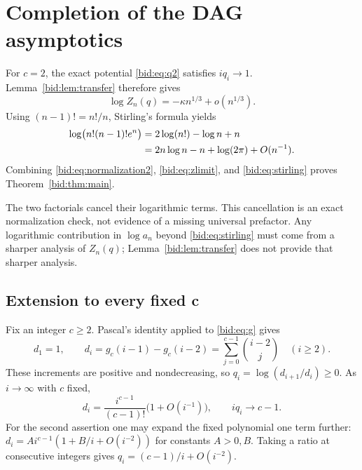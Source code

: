 \documentclass[11pt,letterpaper]{article}
\numberwithin{equation}{section}
\theoremstyle{remark}\newtheorem{remark}[theorem]{Remark}
\begin{document}
\section{Completion of the DAG asymptotics}\label{bid:sec:completion}
For $c=2$, the exact potential \eqref{bid:eq:q2} satisfies
$iq_i\to1$. Lemma~\ref{bid:lem:transfer} therefore gives
\begin{equation}\label{bid:eq:zlimit}
 \log Z_n(q)=-\kappa n^{1/3}+o(n^{1/3}).
\end{equation}
Using $(n-1)!=n!/n$, Stirling's formula yields
\begin{align}
 \log\bigl(n!(n-1)!e^n\bigr)
 &=2\log(n!)-\log n+n\notag\\
 &=2n\log n-n+\log(2\pi)+O(n^{-1}).\label{bid:eq:stirling}
\end{align}
Combining \eqref{bid:eq:normalization2}, \eqref{bid:eq:zlimit}, and
\eqref{bid:eq:stirling} proves Theorem~\ref{bid:thm:main}.

The two factorials cancel their logarithmic terms. This cancellation
is an exact normalization check, not evidence of a missing universal
prefactor. Any logarithmic contribution in $\log a_n$ beyond
\eqref{bid:eq:stirling} must come from a sharper analysis of $Z_n(q)$;
Lemma~\ref{bid:lem:transfer} does not provide that sharper analysis.

\subsection{Extension to every fixed c}
Fix an integer $c\geq2$. Pascal's identity applied to \eqref{bid:eq:g} gives
\begin{equation}\label{bid:eq:generald}
 d_1=1,\qquad
 d_i=g_c(i-1)-g_c(i-2)
     =\sum_{j=0}^{c-1}\binom{i-2}{j}\quad(i\geq2).
\end{equation}
These increments are positive and nondecreasing, so
$q_i=\log(d_{i+1}/d_i)\geq0$. As $i\to\infty$ with $c$ fixed,
\begin{equation}\label{bid:eq:dasymptotic}
 d_i=\frac{i^{c-1}}{(c-1)!}\bigl(1+O(i^{-1})\bigr),
 \qquad iq_i\longrightarrow c-1.
\end{equation}
For the second assertion one may expand the fixed polynomial one term
further: $d_i=A i^{c-1}(1+B/i+O(i^{-2}))$ for constants $A>0,B$.
Taking a ratio at consecutive integers gives
$q_i=(c-1)/i+O(i^{-2})$.
\end{document}
